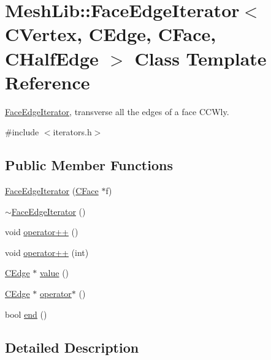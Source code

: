 \hypertarget{class_mesh_lib_1_1_face_edge_iterator}{}\section{Mesh\+Lib\+:\+:Face\+Edge\+Iterator$<$ C\+Vertex, C\+Edge, C\+Face, C\+Half\+Edge $>$ Class Template Reference}
\label{class_mesh_lib_1_1_face_edge_iterator}


\hyperlink{class_mesh_lib_1_1_face_edge_iterator}{Face\+Edge\+Iterator}, transverse all the edges of a face C\+C\+Wly.  




{\ttfamily \#include $<$iterators.\+h$>$}

\subsection*{Public Member Functions}
\begin{DoxyCompactItemize}
\item 
\hyperlink{class_mesh_lib_1_1_face_edge_iterator_a73b6a961906309febf686830999e5b9b}{Face\+Edge\+Iterator} (\hyperlink{class_mesh_lib_1_1_c_face}{C\+Face} $\ast$f)
\item 
\hyperlink{class_mesh_lib_1_1_face_edge_iterator_abbc2d0f2fa3d6f160640870b0e7875bb}{$\sim$\+Face\+Edge\+Iterator} ()
\item 
void \hyperlink{class_mesh_lib_1_1_face_edge_iterator_a62c91827805723e19ded7a85edf1625b}{operator++} ()
\item 
void \hyperlink{class_mesh_lib_1_1_face_edge_iterator_ab44f25c24611bf61f35d42687c23e502}{operator++} (int)
\item 
\hyperlink{class_mesh_lib_1_1_c_edge}{C\+Edge} $\ast$ \hyperlink{class_mesh_lib_1_1_face_edge_iterator_a84357c09fa86c7382ffc1b64f47dc601}{value} ()
\item 
\hyperlink{class_mesh_lib_1_1_c_edge}{C\+Edge} $\ast$ \hyperlink{class_mesh_lib_1_1_face_edge_iterator_af592c6a6fd3154aa3492db9f4b20c9c3}{operator$\ast$} ()
\item 
bool \hyperlink{class_mesh_lib_1_1_face_edge_iterator_a84af7266112582d76a84cb979523d0a1}{end} ()
\end{DoxyCompactItemize}


\subsection{Detailed Description}
